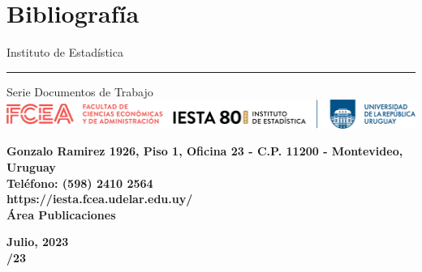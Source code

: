 \documentclass[12pt]{article}
\begin{document}
\section{Bibliografía}

\printbibliography



\pagebreak
\thispagestyle{empty}
\begin{center}

\vspace{1.5 cm}
{\Huge Instituto de Estadística} 
\noindent\rule{18cm}{0.4pt}

\vspace{0.5 cm}
\pagestyle{fancy}
{\Huge Serie Documentos de Trabajo}\\
\thispagestyle{empty}
\vspace{1.5 cm}
\includegraphics[width=1.00\textwidth]{grafi/logo_inst_80.png}

\thispagestyle{empty}
\vspace{4.5 cm}

\begin{flushright}
	\textbf{\large Gonzalo Ramirez 1926, Piso 1, Oficina 23 - C.P. 11200 - Montevideo, Uruguay\\
		Teléfono: (598) 2410 2564\\
		https://iesta.fcea.udelar.edu.uy/\\
		Área Publicaciones\\}	
\end{flushright}

\vspace{1.5 cm}

\large\textbf{Julio, 2023}\\
\vspace{0.5 cm}
\large\textbf{/23}
\end{center}
\end{document}
